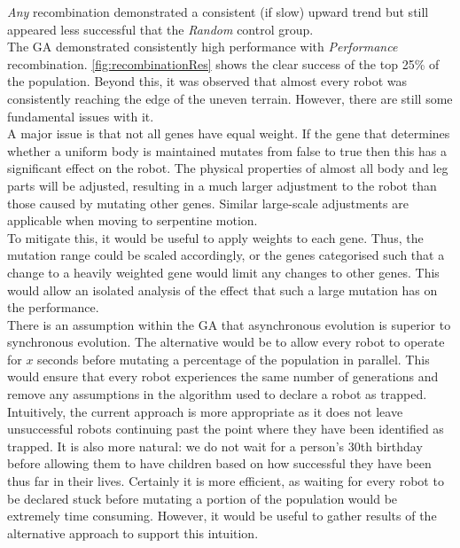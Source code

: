 \documentclass{article}
\begin{document}
\textit{Any} recombination demonstrated a consistent (if slow) upward trend but still appeared less successful that the \textit{Random} control group.\\
The GA demonstrated consistently high performance with \textit{Performance} recombination. \autoref{fig:recombinationRes} shows the clear success of the top 25\% of the population. Beyond this, it was observed that almost every robot was consistently reaching the edge of the uneven terrain. However, there are still some fundamental issues with it.\\
A major issue is that not all genes have equal weight. If the gene that determines whether a uniform body is maintained mutates from false to true then this has a significant effect on the robot. The physical properties of almost all body and leg parts will be adjusted, resulting in a much larger adjustment to the robot than those caused by mutating other genes. Similar large-scale adjustments are applicable when moving to serpentine motion.\\
To mitigate this, it would be useful to apply weights to each gene. Thus, the mutation range could be scaled accordingly, or the genes categorised such that a change to a heavily weighted gene would limit any changes to other genes. This would allow an isolated analysis of the effect that such a large mutation has on the performance.\\

There is an assumption within the GA that asynchronous evolution is superior to synchronous evolution. The alternative would be to allow every robot to operate for $x$ seconds before mutating a percentage of the population in parallel. This would ensure that every robot experiences the same number of generations and remove any assumptions in the algorithm used to declare a robot as trapped. \\
Intuitively, the current approach is more appropriate as it does not leave unsuccessful robots continuing past the point where they have been identified as trapped. It is also more natural: we do not wait for a person’s 30th birthday before allowing them to have children based on how successful they have been thus far in their lives. Certainly it is more efficient, as waiting for every robot to be declared stuck before mutating a portion of the population would be extremely time consuming. However, it would be useful to gather results of the alternative approach to support this intuition. \\
\end{document}
